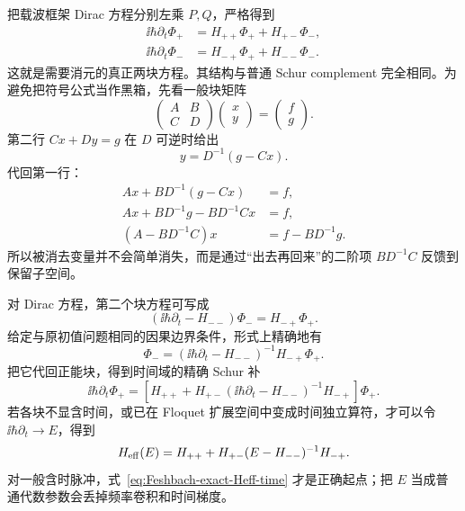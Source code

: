 把载波框架 Dirac 方程分别左乘 $P,Q$，严格得到
\begin{align}
 \ii\hbar\partial_t\Phi_+
 &=H_{++}\Phi_+ +H_{+-}\Phi_-,\\
 \ii\hbar\partial_t\Phi_-
 &=H_{-+}\Phi_+ +H_{--}\Phi_-.
 \label{eq:Feshbach-coupled}
\end{align}
这就是需要消元的真正两块方程。其结构与普通 Schur complement 完全相同。为避免把符号公式当作黑箱，先看一般块矩阵
\begin{equation}
\begin{pmatrix}A&B\\ C&D\end{pmatrix}
\begin{pmatrix}x\\ y\end{pmatrix}
=
\begin{pmatrix}f\\ g\end{pmatrix}.
\label{eq:schur-two-block}
\end{equation}
第二行 $Cx+Dy=g$ 在 $D$ 可逆时给出
\begin{equation}
y=D^{-1}(g-Cx).
\end{equation}
代回第一行：
\begin{align}
Ax+BD^{-1}(g-Cx)&=f,\\
Ax+BD^{-1}g-BD^{-1}Cx&=f,\\
\left(A-BD^{-1}C\right)x&=f-BD^{-1}g.
\label{eq:schur-reduced}
\end{align}
所以被消去变量并不会简单消失，而是通过“出去再回来”的二阶项 $BD^{-1}C$ 反馈到保留子空间。

对 Dirac 方程，第二个块方程可写成
\begin{equation}
 \left(\ii\hbar\partial_t-H_{--}\right)\Phi_-
 =H_{-+}\Phi_+.
 \label{eq:Feshbach-Q-equation}
\end{equation}
给定与原初值问题相同的因果边界条件，形式上精确地有
\begin{equation}
 {
 \Phi_-
 =\left(\ii\hbar\partial_t-H_{--}\right)^{-1}
 H_{-+}\Phi_+.}
 \label{eq:Feshbach-exact-resolvent}
\end{equation}
把它代回正能块，得到时间域的精确 Schur 补
\begin{equation}
 {
 \ii\hbar\partial_t\Phi_+
 =\left[
 H_{++}
 +H_{+-}\left(\ii\hbar\partial_t-H_{--}\right)^{-1}H_{-+}
 \right]\Phi_+.}
 \label{eq:Feshbach-exact-Heff-time}
\end{equation}
若各块不显含时间，或已在 Floquet 扩展空间中变成时间独立算符，才可以令 $\ii\hbar\partial_t\to E$，得到
\begin{equation}
H_{\rm eff}(E)
=H_{++}+H_{+-}(E-H_{--})^{-1}H_{-+}.
\label{eq:Feshbach-Schur-energy}
\end{equation}
对一般含时脉冲，式~\cref{eq:Feshbach-exact-Heff-time} 才是正确起点；把 $E$ 当成普通代数参数会丢掉频率卷积和时间梯度。

